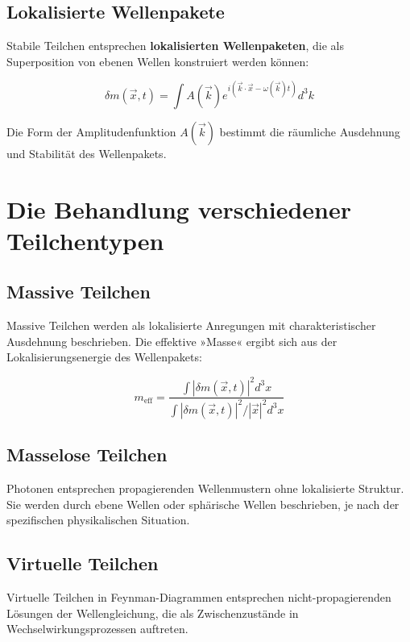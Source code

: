 \documentclass[12pt,a4paper]{report}
\begin{document}
	\subsection{Lokalisierte Wellenpakete}
	
	Stabile Teilchen entsprechen \textbf{lokalisierten Wellenpaketen}, die als Superposition von ebenen Wellen konstruiert werden können:
	
	\begin{equation}
		\delta m(\vec{x},t) = \int A(\vec{k}) e^{i(\vec{k} \cdot \vec{x} - \omega(\vec{k})t)} d^3k
	\end{equation}
	
	Die Form der Amplitudenfunktion $A(\vec{k})$ bestimmt die räumliche Ausdehnung und Stabilität des Wellenpakets.
	
	\section{Die Behandlung verschiedener Teilchentypen}
	
	\subsection{Massive Teilchen}
	
	Massive Teilchen werden als lokalisierte Anregungen mit charakteristischer Ausdehnung beschrieben. Die effektive »Masse« ergibt sich aus der Lokalisierungsenergie des Wellenpakets:
	
	\begin{equation}
		m_{\text{eff}} = \frac{\int |\delta m(\vec{x},t)|^2 d^3x}{\int |\delta m(\vec{x},t)|^2 / |\vec{x}|^2 d^3x}
	\end{equation}
	
	\subsection{Masselose Teilchen}
	
	Photonen entsprechen propagierenden Wellenmustern ohne lokalisierte Struktur. Sie werden durch ebene Wellen oder sphärische Wellen beschrieben, je nach der spezifischen physikalischen Situation.
	
	\subsection{Virtuelle Teilchen}
	
	Virtuelle Teilchen in Feynman-Diagrammen entsprechen nicht-propagierenden Lösungen der Wellengleichung, die als Zwischenzustände in Wechselwirkungsprozessen auftreten.
	
\end{document}

